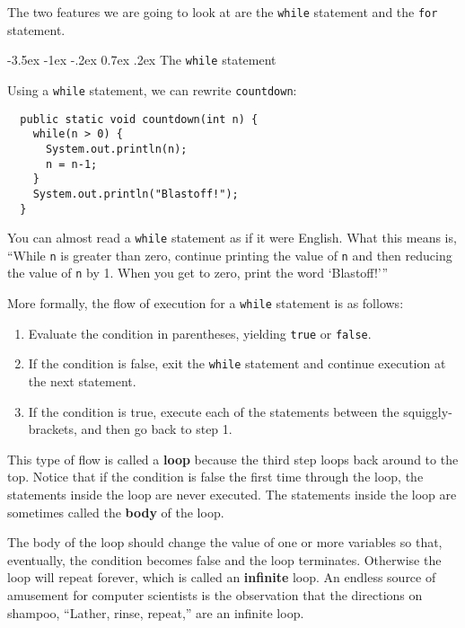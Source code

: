 \documentclass{book}
\makeatletter
\renewcommand{\section}{\@startsection 
    {section} {1} {0mm}%
    {-3.5ex \@plus -1ex \@minus -.2ex}%
    {0.7ex \@plus.2ex}%
    {\normalfont\Large\bfseries}}
\makeatother
\begin{document}
The two features we are going to look at are the {\tt while}
statement and the {\tt for} statement.

\section{The {\tt while} statement}

Using a {\tt while} statement, we can rewrite {\tt countdown}:

\begin{verbatim}
  public static void countdown(int n) {
    while(n > 0) {
      System.out.println(n);
      n = n-1;
    }
    System.out.println("Blastoff!");
  }
\end{verbatim}
%
You can almost read a {\tt while} statement as if it were
English.  What this means is, ``While {\tt n} is greater than
zero, continue printing the value of {\tt n} and then reducing
the value of {\tt n} by 1.  When you get to zero, print the
word `Blastoff!'''

More formally, the flow of execution for a {\tt while} statement
is as follows:

\begin{enumerate}

\item Evaluate the condition in parentheses, yielding {\tt true}
or {\tt false}.

\item If the condition is false, exit the {\tt while} statement
and continue execution at the next statement.

\item If the condition is true, execute each of the statements
between the squiggly-brackets, and then go back to step 1.

\end{enumerate}

This type of flow is called a {\bf loop} because the third step loops
back around to the top.  Notice that if the condition is false the
first time through the loop, the statements inside the loop are
never executed.  The statements inside the loop are sometimes called
the {\bf body} of the loop.


The body of the loop should change the value of
one or more variables so that, eventually, the condition becomes
false and the loop terminates.  Otherwise the loop will repeat
forever, which is called an {\bf infinite} loop.  An endless
source of amusement for computer scientists is the observation
that the directions on shampoo, ``Lather, rinse, repeat,'' are
an infinite loop.
\end{document}

